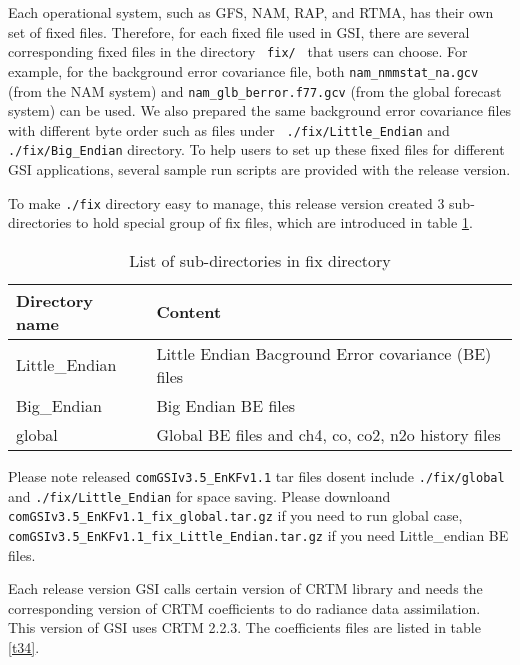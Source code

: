 Each operational system, such as GFS, NAM, RAP, and RTMA, has their own set of fixed files. Therefore, for each fixed file used in GSI, there are several corresponding fixed files in the directory \verb| fix/ | that users can choose. For example, for the background error covariance file, both \verb|nam_nmmstat_na.gcv| (from the NAM system) and \verb|nam_glb_berror.f77.gcv| (from the global forecast system) can be used. We also prepared the same background error covariance files with different byte order such as files under \verb| ./fix/Little_Endian| and \verb| ./fix/Big_Endian| directory. To help users to set up these fixed files for different GSI applications, several sample run scripts are provided with the release version.

To make \verb|./fix| directory easy to manage, this release version created 3 sub-directories to hold special group of fix files, which are introduced in table \ref{t33}.


\begin{table}[htbp]
\centering
\begin{small}
\caption{List of sub-directories in fix directory}
\begin{tabular}{|p{3cm}|p{9cm}|}
\hline
\hline
Directory name  & Content  \\
\hline
\hline
Little\_Endian & Little Endian Bacground Error covariance  (BE) files \\
\hline
Big\_Endian & Big Endian BE files \\
\hline
global & Global BE files and ch4, co, co2, n2o history files \\
\hline
\end{tabular}
\label{t33}
\end{small}
\end{table} 


Please note released \verb|comGSIv3.5_EnKFv1.1| tar files dosen\textquotesingle t include \verb|./fix/global| and \verb|./fix/Little_Endian| for space saving. Please downloand \verb|comGSIv3.5_EnKFv1.1_fix_global.tar.gz| if you need to run global case, \verb|comGSIv3.5_EnKFv1.1_fix_Little_Endian.tar.gz| if you need Little\_endian BE files. 

Each release version GSI calls certain version of CRTM library and needs the corresponding version of CRTM coefficients to do radiance data assimilation. This version of GSI uses CRTM 2.2.3. The coefficients files are listed in table \ref{t34}.


